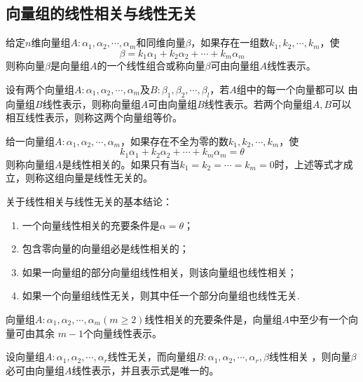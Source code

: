 \subsection{向量组的线性相关与线性无关}
\begin{definition}
    给定$n$维向量组$A:\alpha_1,\alpha_2,\cdots,\alpha_m$和同维向量$\beta$，如果存在一组数$k_1,k_2,\cdots,k_m$，使
    $$\beta=k_1\alpha_1+k_2\alpha_2+\cdots+k_m\alpha_m$$
    则称向量$\beta$是向量组$A$的一个线性组合或称向量$\beta$可由向量组$A$线性表示。
\end{definition}

\begin{definition}[等价向量组]
    设有两个向量组$A:\alpha_1,\alpha_2,\cdots,\alpha_m$及$B:\beta_1,\beta_2,\cdots,\beta_l$，若$A$组中的每一个向量都可以
    由向量组$B$线性表示，则称向量组$A$可由向量组$B$线性表示。若两个向量组$A,B$可以相互线性表示，则称这两个{\heiti 向量组等价}。
\end{definition}

\begin{definition}[线性相关与线性无关]
    给一向量组$A:\alpha_1,\alpha_2,\cdots,\alpha_m$，如果存在不全为零的数$k_1,k_2,\cdots,k_m$，使
    $$k_1\alpha_1+k_2\alpha_2+\cdots+k_m\alpha_m=\theta$$
    则称向量组$A$是{\heiti 线性相关}的。如果只有当$k_1=k_2=\cdots=k_m=0$时，上述等式才成立，则称这组向量是{\heiti 线性无关}的。
\end{definition}

\begin{theorem}
    关于线性相关与线性无关的基本结论：
    \begin{enumerate}[(1)]
        \item 一个向量线性相关的充要条件是$\alpha=\theta$；
        \item 包含零向量的向量组必是线性相关的；
        \item 如果一向量组的部分向量组线性相关，则该向量组也线性相关；
        \item 如果一个向量组线性无关，则其中任一个部分向量组也线性无关.
    \end{enumerate}
\end{theorem}

\begin{theorem}
    向量组$A:\alpha_1,\alpha_2,\cdots,\alpha_m(m\geq 2)$线性相关的充要条件是，向量组$A$中至少有一个向量可由其余
    $m-1$个向量线性表示。
\end{theorem}

\begin{theorem}
    设向量组$A:\alpha_1,\alpha_2,\cdots,\alpha_r$线性无关，而向量组$B:\alpha_1,\alpha_2,\cdots,\alpha_r,\beta$线性相关
    ，则向量$\beta$必可由向量组$A$线性表示，并且表示式是唯一的。
\end{theorem}

